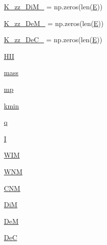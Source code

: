 \begin{DoxyCompactItemize}
\hyperlink{namespacebackground__diffusion__coefficient__3_ab256b68071602bc9bb1ab6099b6089aa}{K\+\_\+zz\+\_\+\+Di\+M\+\_} = np.\+zeros(len(\hyperlink{namespacebackground__diffusion__coefficient__3_a1058d24f7b8074e2f1e48e5031b4ceac}{E}))
\item 
\hyperlink{namespacebackground__diffusion__coefficient__3_a0c29004aeade9b554c931c66992e4e8f}{K\+\_\+zz\+\_\+\+De\+M\+\_} = np.\+zeros(len(\hyperlink{namespacebackground__diffusion__coefficient__3_a1058d24f7b8074e2f1e48e5031b4ceac}{E}))
\item 
\hyperlink{namespacebackground__diffusion__coefficient__3_a972b8349299ec41693ddb6b70bc0f44e}{K\+\_\+zz\+\_\+\+De\+C\+\_} = np.\+zeros(len(\hyperlink{namespacebackground__diffusion__coefficient__3_a1058d24f7b8074e2f1e48e5031b4ceac}{E}))
\item 
\hyperlink{namespacebackground__diffusion__coefficient__3_a6440cb0f0f275d6f00a613b1dd053f17}{H\+II}
\item 
\hyperlink{namespacebackground__diffusion__coefficient__3_a371923684d4677ca28f5b051f0a53350}{mass}
\item 
\hyperlink{namespacebackground__diffusion__coefficient__3_a55dbeca220ce89e9c957345a7e1b666d}{mp}
\item 
\hyperlink{namespacebackground__diffusion__coefficient__3_a044fed0ffa9bb1f8e2e56a47d011c6c4}{kmin}
\item 
\hyperlink{namespacebackground__diffusion__coefficient__3_ad80a2cd44fd33cd1bff997e78975d416}{q}
\item 
\hyperlink{namespacebackground__diffusion__coefficient__3_ae8e911c56735382f22cc25b5749e51fe}{I}
\item 
\hyperlink{namespacebackground__diffusion__coefficient__3_ac6e44d6d5355ed4c2e5921dd2d2d7318}{W\+IM}
\item 
\hyperlink{namespacebackground__diffusion__coefficient__3_a05c581528fa69f77cd07a18178a712e5}{W\+NM}
\item 
\hyperlink{namespacebackground__diffusion__coefficient__3_ae8e209511c4edf382b7f11cf7b9438e3}{C\+NM}
\item 
\hyperlink{namespacebackground__diffusion__coefficient__3_ad64879cccdde28f73214a51cc504438f}{DiM}
\item 
\hyperlink{namespacebackground__diffusion__coefficient__3_aa4d67c403e028a89037cd4848f7f325f}{DeM}
\item 
\hyperlink{namespacebackground__diffusion__coefficient__3_aada1cc0a9036b4408f4cbe87dd949bf8}{DeC}
\item 

\end{DoxyCompactItemize}
